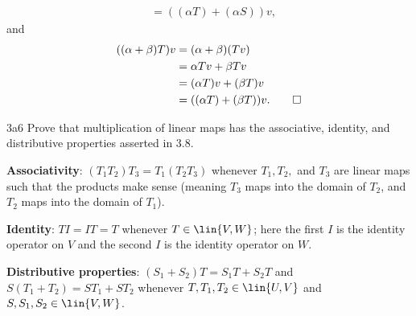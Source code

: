\begin{sol}
\begin{enumerate}
\begin{align*}
            & = ((\alpha T) + (\alpha S))v,
        \end{align*}
        and
        \begin{align*}
            ((\alpha + \beta)T)v & = (\alpha + \beta)(Tv) \\
            & = \alpha Tv + \beta Tv \\
            & = (\alpha T)v + (\beta T)v \\
            & = ((\alpha T) + (\beta T))v. \qedhere
        \end{align*}
    \end{enumerate}
\end{sol}

\begin{exercise}{3a6}
    Prove that multiplication of linear maps has the associative, identity, and distributive properties asserted in 3.8.
    \begin{subexercises}
        \item \textbf{Associativity}: $(T_1T_2)T_3 = T_1(T_2T_3)$ whenever $T_1, T_2,$ and $T_3$ are linear maps such that the products make sense (meaning $T_3$ maps into the domain of $T_2$, and $T_2$ maps into the domain of $T_1$).
        \item \textbf{Identity}: $TI = IT = T$ whenever $T \in \lin{V, W}$; here the first $I$ is the identity operator on $V$ and the second $I$ is the identity operator on $W$.
        \item \textbf{Distributive properties}: $(S_1 + S_2)T = S_1T + S_2T$ and $S(T_1 + T_2) = ST_1 + ST_2$ whenever $T, T_1, T_2 \in \lin{U, V}$ and $S, S_1, S_2 \in \lin{V, W}$.
    \end{subexercises}
\end{exercise}

